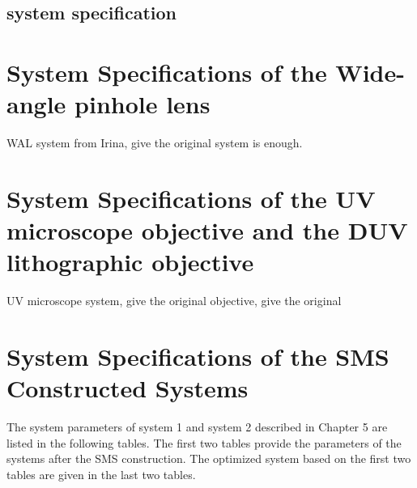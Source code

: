 \section{system specification}



\chapter{System Specifications of the Wide-angle pinhole lens}
\item WAL system from Irina, give the original system is enough.
\label{apdx: chapter-3-system-spec}
\chapter{System Specifications of the UV microscope objective and the DUV lithographic objective} 
\label{apdx: chapter-4-system-spec}
\item UV microscope system, give the original 
\DUV objective, give the original

\chapter{System Specifications of the SMS Constructed Systems} 
\label{apdx: chapter-5-system-spec}
\graphicspath{ {./Appendix/figures/} }  %
\captionsetup[figure]{labelfont=bf}
\captionsetup{margin=1.5em}
\captionsetup[table]{labelfont=bf}

The system parameters of system 1 and system 2 described in Chapter 5 are listed in the following tables. The first two tables provide the parameters of the systems after the SMS construction. The optimized system based on the first two tables are given in the last two tables. 


